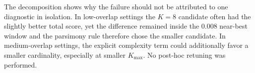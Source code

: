 \begin{table}[H]
\centering
\caption{G11B mean weighted score-term differences: selected proposal minus $K=8$.}
\scriptsize
{}
\end{table}

The decomposition shows why the failure should not be attributed to one diagnostic in isolation. In low-overlap settings the $K=8$ candidate often had the slightly better total score, yet the difference remained inside the 0.008 near-best window and the parsimony rule therefore chose the smaller candidate. In medium-overlap settings, the explicit complexity term could additionally favor a smaller cardinality, especially at smaller $K_{\max}$. No post-hoc retuning was performed.
